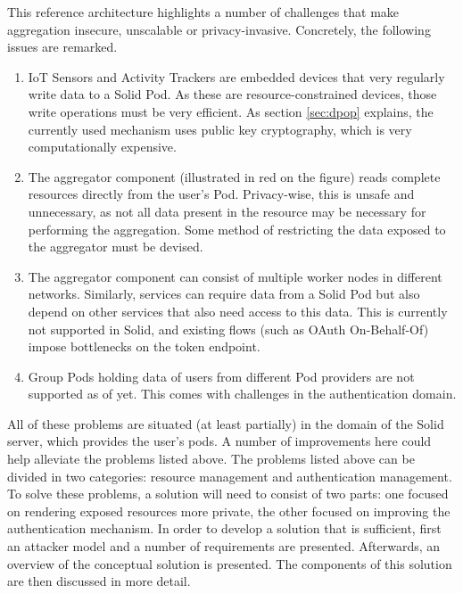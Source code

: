 \noindent This reference architecture highlights a number of challenges that make aggregation insecure, unscalable or privacy-invasive. Concretely, the following issues are remarked.

\begin{enumerate}
    \item IoT Sensors and Activity Trackers are embedded devices that very regularly write data to a Solid Pod. As these are resource-constrained devices, those write operations must be very efficient. As section \ref{sec:dpop} explains, the currently used mechanism uses public key cryptography, which is very computationally expensive.
    \item The aggregator component (illustrated in red on the figure) reads complete resources directly from the user's Pod. Privacy-wise, this is unsafe and unnecessary, as not all data present in the resource may be necessary for performing the aggregation. Some method of restricting the data exposed to the aggregator must be devised.
    \item The aggregator component can consist of multiple worker nodes in different networks. Similarly, services can require data from a Solid Pod but also depend on other services that also need access to this data. This is currently not supported in Solid, and existing flows (such as OAuth On-Behalf-Of) impose bottlenecks on the token endpoint. 
    \item Group Pods holding data of users from different Pod providers are not supported as of yet. This comes with challenges in the authentication domain.
\end{enumerate}

\noindent All of these problems are situated (at least partially) in the domain of the Solid server, which provides the user's pods. A number of improvements here could help alleviate the problems listed above. The problems listed above can be divided in two categories: resource management and authentication management. To solve these problems, a solution will need to consist of two parts: one focused on rendering exposed resources more private, the other focused on improving the authentication mechanism. In order to develop a solution that is sufficient, first an attacker model and a number of requirements are presented. Afterwards, an overview of the conceptual solution is presented. The components of this solution are then discussed in more detail.

\newpage
